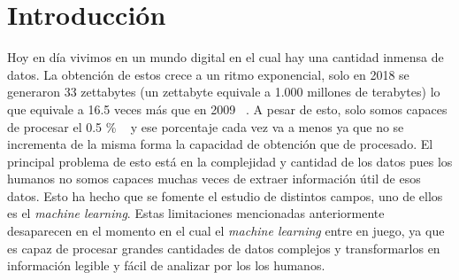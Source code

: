 \documentclass[a4paper, 12pt]{book}
\begin{document}


\tableofcontents 
\cleardoublepage
\listoffigures %



\cleardoublepage
\chapter{Introducción}
\label{sec:intro} %

Hoy en día vivimos en un mundo digital en el cual hay una cantidad inmensa de datos. La obtención de estos crece a un ritmo exponencial, solo en 2018 se generaron 33 zettabytes (un zettabyte equivale a 1.000 millones de terabytes) lo que equivale a 16.5 veces más que en 2009 ~\cite{webstatista}. A pesar de esto, solo somos capaces de procesar el 0.5 \% ~\cite{machinelearning} y ese porcentaje cada vez va a menos ya que no se incrementa de la misma forma la capacidad de obtención que de procesado. El principal problema de esto está en la complejidad y cantidad de los datos pues los humanos no somos capaces muchas veces de extraer información útil de esos datos. Esto ha hecho que se fomente el estudio de distintos campos, uno de ellos es el \emph{machine learning}. Estas limitaciones mencionadas anteriormente desaparecen en el momento en el cual el \emph{machine learning} entre en juego, ya que es capaz de procesar grandes cantidades de datos complejos y transformarlos en información legible y fácil de analizar por los los humanos.
\end{document}
